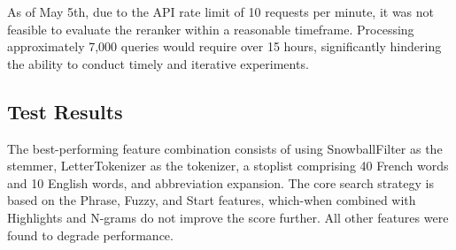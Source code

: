 As of May 5th, due to the API rate limit of 10 requests per minute, it was not feasible to evaluate the reranker within a reasonable timeframe. Processing approximately 7,000 queries would require over 15 hours, significantly hindering the ability to conduct timely and iterative experiments.

\subsection{Test Results}
\label{subsec:Test Results}
The best-performing feature combination consists of using SnowballFilter as the stemmer, LetterTokenizer as the tokenizer, a stoplist comprising 40 French words and 10 English words, and abbreviation expansion.
The core search strategy is based on the Phrase, Fuzzy, and Start features, which-when combined with Highlights and N-grams do not improve the score further. All other features were found to degrade performance.